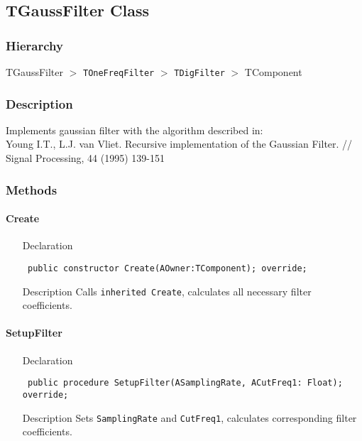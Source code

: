 \documentclass[12pt,a4paper,oneside]{report}
\newcommand{\declarationitem}[1]{{\addfontfeatures{FakeBold=1.3} #1}}
\newcommand{\descriptiontitle}[1]{{\addfontfeatures{FakeSlant}#1}}
\newcommand{\code}[1]{\texttt{#1}}
\begin{document}
\subsection{TGaussFilter Class}
\label{lmfilters.TGaussFilter}
\subsubsection{Hierarchy}
TGaussFilter {$>$} \code{TOneFreqFilter} {$>$} \code{TDigFilter} {$>$} TComponent
\subsubsection{Description}
Implements gaussian filter with the algorithm described in:\\
Young I.T., L.J. van Vliet. Recursive implementation of the Gaussian Filter. // Signal Processing, 44 (1995) 139-151
\subsubsection{Methods}
\paragraph{Create}\hspace*{\fill}
\label{lmfilters.TGaussFilter-Create}
\begin{itemize}\item[\declarationitem{Declaration}\hfill]
	\begin{flushleft}
		\code{
			public constructor Create(AOwner:TComponent); override;}
	\end{flushleft}
\item[\descriptiontitle{Description}] Calls \code{inherited Create}, calculates all necessary filter coefficients.
\end{itemize}
\paragraph{SetupFilter}\hspace*{\fill}
\label{lmfilters.TGaussFilter-SetupFilter}
\begin{itemize}\item[\declarationitem{Declaration}\hfill]
	\begin{flushleft}
		\code{
			public procedure SetupFilter(ASamplingRate, ACutFreq1: Float); override;}
	\end{flushleft}
\item[\descriptiontitle{Description}] Sets \code{SamplingRate} and \code{CutFreq1}, calculates corresponding filter coefficients. 
\end{itemize}
\end{document}

